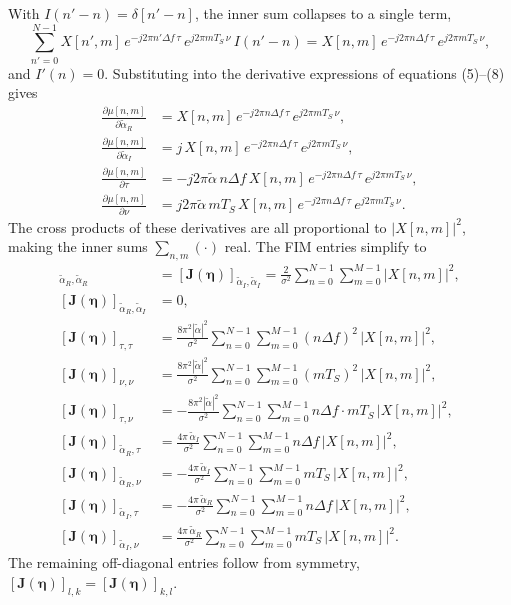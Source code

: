 \documentclass[11pt]{article}
\begin{document}
With \(I(n'-n) = \delta[n'-n]\), the inner sum collapses to a single term,
\begin{equation}
    \sum_{n'=0}^{N-1} X[n',m]\, e^{-j2\pi n'\Delta f\, \tau}\, e^{j2\pi mT_S\, \nu}\, I(n'-n) = X[n,m]\, e^{-j2\pi n\Delta f\, \tau}\, e^{j2\pi mT_S\, \nu},
\end{equation}
and \(I'(n) = 0\). Substituting into the derivative expressions of equations (5)--(8) gives
\begin{align}
    \frac{\partial \mu[n,m]}{\partial \tilde{\alpha}_{R}} &= X[n,m]\, e^{-j2\pi n\Delta f\, \tau}\, e^{j2\pi mT_S\, \nu}, \\
    \frac{\partial \mu[n,m]}{\partial \tilde{\alpha}_{I}} &= j\, X[n,m]\, e^{-j2\pi n\Delta f\, \tau}\, e^{j2\pi mT_S\, \nu}, \\
    \frac{\partial \mu[n,m]}{\partial \tau} &= -j2\pi \tilde{\alpha}\, n\Delta f\, X[n,m]\, e^{-j2\pi n\Delta f\, \tau}\, e^{j2\pi mT_S\, \nu}, \\
    \frac{\partial \mu[n,m]}{\partial \nu} &= j2\pi \tilde{\alpha}\, mT_S\, X[n,m]\, e^{-j2\pi n\Delta f\, \tau}\, e^{j2\pi mT_S\, \nu}.
\end{align}
The cross products of these derivatives are all proportional to \(|X[n,m]|^2\), making the inner sums \(\sum_{n,m}(\cdot)\) real. The FIM entries simplify to
\begin{align}
    [\bm{J}(\bm{\eta})]_{\tilde{\alpha}_{R}, \tilde{\alpha}_{R}} &= [\bm{J}(\bm{\eta})]_{\tilde{\alpha}_{I}, \tilde{\alpha}_{I}} = \frac{2}{\sigma^2} \sum_{n=0}^{N-1} \sum_{m=0}^{M-1} |X[n,m]|^2, \\
    [\bm{J}(\bm{\eta})]_{\tilde{\alpha}_{R}, \tilde{\alpha}_{I}} &= 0, \\
    [\bm{J}(\bm{\eta})]_{\tau, \tau} &= \frac{8\pi^2 |\tilde{\alpha}|^2}{\sigma^2} \sum_{n=0}^{N-1} \sum_{m=0}^{M-1} (n\Delta f)^2\, |X[n,m]|^2, \\
    [\bm{J}(\bm{\eta})]_{\nu, \nu} &= \frac{8\pi^2 |\tilde{\alpha}|^2}{\sigma^2} \sum_{n=0}^{N-1} \sum_{m=0}^{M-1} (mT_S)^2\, |X[n,m]|^2, \\
    [\bm{J}(\bm{\eta})]_{\tau, \nu} &= -\frac{8\pi^2 |\tilde{\alpha}|^2}{\sigma^2} \sum_{n=0}^{N-1} \sum_{m=0}^{M-1} n\Delta f \cdot mT_S\, |X[n,m]|^2, \\
    [\bm{J}(\bm{\eta})]_{\tilde{\alpha}_{R}, \tau} &= \frac{4\pi\, \tilde{\alpha}_I}{\sigma^2} \sum_{n=0}^{N-1} \sum_{m=0}^{M-1} n\Delta f\, |X[n,m]|^2, \\
    [\bm{J}(\bm{\eta})]_{\tilde{\alpha}_{R}, \nu} &= -\frac{4\pi\, \tilde{\alpha}_I}{\sigma^2} \sum_{n=0}^{N-1} \sum_{m=0}^{M-1} mT_S\, |X[n,m]|^2, \\
    [\bm{J}(\bm{\eta})]_{\tilde{\alpha}_{I}, \tau} &= -\frac{4\pi\, \tilde{\alpha}_R}{\sigma^2} \sum_{n=0}^{N-1} \sum_{m=0}^{M-1} n\Delta f\, |X[n,m]|^2, \\
    [\bm{J}(\bm{\eta})]_{\tilde{\alpha}_{I}, \nu} &= \frac{4\pi\, \tilde{\alpha}_R}{\sigma^2} \sum_{n=0}^{N-1} \sum_{m=0}^{M-1} mT_S\, |X[n,m]|^2.
\end{align}
The remaining off-diagonal entries follow from symmetry, \([\bm{J}(\bm{\eta})]_{l,k} = [\bm{J}(\bm{\eta})]_{k,l}\).
\end{document}
